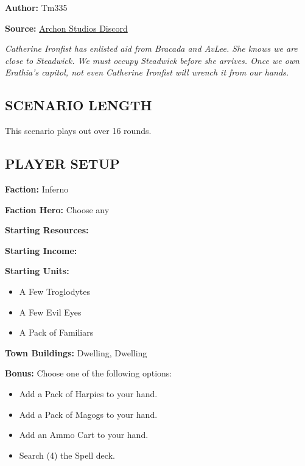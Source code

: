
\begin{multicols*}{2}

\textbf{Author:} Tm335

\textbf{Source:} \href{https://discord.com/channels/740870068178649108/1246353361456861276/1246353361456861276}{Archon Studios Discord}

\textit{Catherine Ironfist has enlisted aid from Bracada and AvLee.
  She knows we are close to Steadwick. We must occupy Steadwick before she arrives.
  Once we own Erathia's capitol, not even Catherine Ironfist will wrench it from our hands.}

\subsection*{\MakeUppercase{Scenario length}}

This scenario plays out over 16 rounds.

\subsection*{\MakeUppercase{Player setup}}

\textbf{Faction:} Inferno

\textbf{Faction Hero:} Choose any

\textbf{Starting Resources:}\par
{}

\textbf{Starting Income:}\par
{}

\textbf{Starting Units:}

\begin{itemize}
  \item A Few Troglodytes
  \item A Few Evil Eyes
  \item A Pack of Familiars
\end{itemize}

\textbf{Town Buildings:}  Dwelling,  Dwelling

\vspace*{\fill}\columnbreak

\textbf{Bonus:} Choose one of the following options:
\begin{itemize}
  \item Add a Pack of Harpies to your hand.
  \item Add a Pack of Magogs to your hand.
  \item Add an Ammo Cart to your hand.
  \item Search (4) the Spell deck.
\end{itemize}


\end{multicols*}
